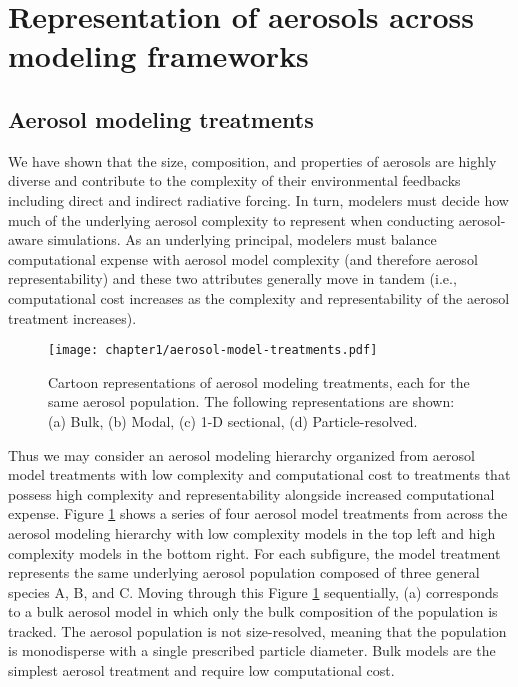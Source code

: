 \section{Representation of aerosols across modeling frameworks}\label{aerosol_model_treatments} 

\subsection{Aerosol modeling treatments}

We have shown that the size, composition, and properties of aerosols are highly diverse and contribute to the complexity of their environmental feedbacks including direct and indirect radiative forcing. In turn, modelers must decide how much of the underlying aerosol complexity to represent when conducting aerosol-aware simulations. As an underlying principal, modelers must balance computational expense with aerosol model complexity (and therefore aerosol representability) and these two attributes generally move in tandem (i.e., computational cost increases as the complexity and representability of the aerosol treatment increases). 

\begin{figure}[!t]
	\centering
	\texttt{[image: chapter1/aerosol-model-treatments.pdf]}
	\caption{Cartoon representations of aerosol modeling treatments, each for the same aerosol population. The following representations are shown: (a) Bulk, (b) Modal, (c) 1-D sectional, (d) Particle-resolved.}
	\label{fig:aerosol-models}
\end{figure}

Thus we may consider an aerosol modeling hierarchy organized from aerosol model treatments with low complexity and computational cost to treatments that possess high complexity and representability alongside increased computational expense. Figure \ref{fig:aerosol-models} shows a series of four aerosol model treatments from across the aerosol modeling hierarchy with low complexity models in the top left and high complexity models in the bottom right. For each subfigure, the model treatment represents the same underlying aerosol population composed of three general species A, B, and C. Moving through this Figure \ref{fig:aerosol-models} sequentially, (a) corresponds to a bulk aerosol model in which only the bulk composition of the population is tracked. The aerosol population is not size-resolved, meaning that the population is monodisperse with a single prescribed particle diameter. Bulk models are the simplest aerosol treatment and require low computational cost. 

